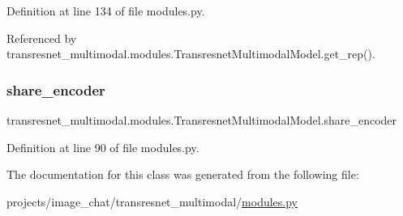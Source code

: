 Definition at line 134 of file modules.\+py.



Referenced by transresnet\+\_\+multimodal.\+modules.\+Transresnet\+Multimodal\+Model.\+get\+\_\+rep().

\mbox{\label{classtransresnet__multimodal_1_1modules_1_1TransresnetMultimodalModel_a64fa905fd4b3a8a8024190c496cb3b78}} 
\subsubsection{\texorpdfstring{share\+\_\+encoder}{share\_encoder}}
{\footnotesize\ttfamily transresnet\+\_\+multimodal.\+modules.\+Transresnet\+Multimodal\+Model.\+share\+\_\+encoder}



Definition at line 90 of file modules.\+py.



The documentation for this class was generated from the following file\+:\begin{DoxyCompactItemize}
\item 
projects/image\+\_\+chat/transresnet\+\_\+multimodal/\hyperlink{projects_2image__chat_2transresnet__multimodal_2modules_8py}{modules.\+py}\end{DoxyCompactItemize}
